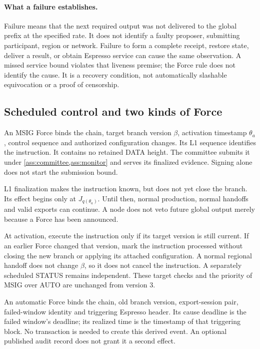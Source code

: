 \documentclass[11pt,a4paper]{article}
\begin{document}
\paragraph{What a failure establishes.}
Failure means that the next required output was not delivered to the
global prefix at the specified rate. It does not identify a faulty
proposer, submitting participant, region or network. Failure to form a
complete receipt, restore state, deliver a result, or obtain Espresso
service can cause the same observation. A missed service bound violates
that liveness premise; the Force rule does not identify the cause. It is a recovery condition,
not automatically slashable equivocation or a proof of censorship.

\subsection{Scheduled control and two kinds of Force}
\label{sec:force-stages}
An MSIG Force binds the chain, target branch version $\beta$, activation
timestamp $\theta_a$, control sequence and authorized configuration
changes. Its L1 sequence identifies the instruction. It contains no
retained DATA height. The committee submits it under
\cref{ass:committee,ass:monitor} and serves its finalized evidence.
Signing alone does not start the submission bound.

L1 finalization makes the instruction known, but does not yet close
the branch. Its effect begins only at $J_{q(\theta_a)}$.
Until then, normal production, normal handoffs and valid exports can
continue. A node does not veto future global output merely because a
Force has been announced.

At activation, execute the instruction only if its target version is
still current. If an earlier Force changed that version, mark the
instruction processed without closing the new branch or applying its
attached configuration. A normal regional handoff does not change
$\beta$, so it does not cancel the instruction. A separately scheduled
STATUS remains independent. These target checks and the priority of
MSIG over AUTO are unchanged from version 3.

An automatic Force binds the chain, old branch version, export-session pair,
failed-window identity and triggering Espresso header. Its cause
deadline is the failed window's deadline; its realized time is the
timestamp of that triggering block. No transaction is needed to create
this derived event. An optional published audit record does not grant
it a second effect.
\end{document}
